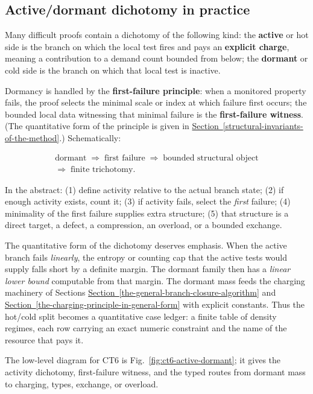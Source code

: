 \documentclass[
  11pt,
]{article}
\theoremstyle{definition}
\newcommand{\secref}[1]{\hyperref[#1]{Section~\ref*{#1}}}
\begin{document}
\subsection*{Active/dormant dichotomy in practice}

Many difficult proofs contain a dichotomy of the following kind:
the \textbf{active} or hot side is the branch on which the local test
fires and pays an \textbf{explicit charge}, meaning a contribution to a
demand count bounded from below; the \textbf{dormant} or cold side is
the branch on which that local test is inactive.

Dormancy is handled by the \textbf{first-failure principle}: when a
monitored property fails, the proof selects the minimal scale or index
at which failure first occurs; the bounded local data witnessing that
minimal failure is the \textbf{first-failure witness}. (The quantitative
form of the principle is given in \secref{structural-invariants-of-the-method}.) Schematically:

\[
\begin{gathered}
\text{dormant}
\;\Rightarrow\;
\text{first failure}
\;\Rightarrow\;
\text{bounded structural object}\\
\Rightarrow\;
\text{finite trichotomy}.
\end{gathered}
\]

In the abstract: (1) define activity relative to the actual branch
state; (2) if enough activity exists, count it; (3) if activity fails,
select the \emph{first} failure; (4) minimality of the first failure
supplies extra structure; (5) that structure is a direct target, a
defect, a compression, an overload, or a bounded exchange.

The quantitative form of the dichotomy deserves emphasis. When the
active branch fails \emph{linearly}, the entropy or counting cap that
the active tests would supply falls short by a definite margin. The
dormant family then has a \emph{linear lower bound} computable from that
margin. The dormant mass feeds the charging machinery of Sections \secref{the-general-branch-closure-algorithm} and
\secref{the-charging-principle-in-general-form} with explicit constants. Thus the hot/cold split becomes a
quantitative case ledger: a finite table of density regimes, each row
carrying an exact numeric constraint and the name of the resource that
pays it.

The low-level diagram for CT6 is Fig.~\ref{fig:ct6-active-dormant};
it gives the activity dichotomy, first-failure witness, and the typed
routes from dormant mass to charging, types, exchange, or overload.
\end{document}
